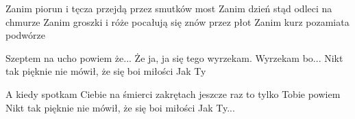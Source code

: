 \documentclass[../../../songbook.tex]{subfiles}
\begin{document}
Zanim piorun i tęcza przejdą przez smutków most \newline
Zanim dzień stąd odleci na chmurze \newline
Zanim groszki i róże pocałują się znów przez płot \newline
Zanim kurz pozamiata podwórze \newline

\-\hspace{1cm} Szeptem na ucho powiem że... \newline
\-\hspace{1cm} Że ja, ja się tego wyrzekam. Wyrzekam bo...  \newline
\-\hspace{1cm} Nikt tak pięknie nie mówił, że się boi miłości \newline
\-\hspace{1cm} Jak Ty \newline

A kiedy spotkam Ciebie na śmierci zakrętach		 \newline
jeszcze raz to tylko Tobie powiem				  \newline
\-\hspace{1cm} Nikt tak pięknie nie mówił, że się boi miłości \newline
\-\hspace{1cm} Jak Ty... 
\end{document}
